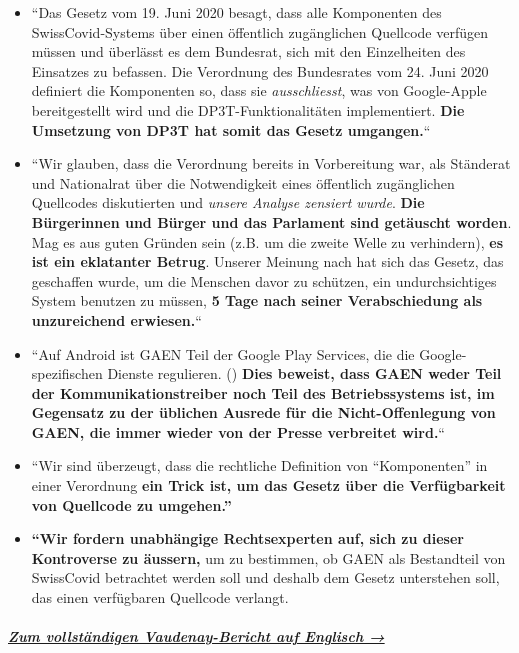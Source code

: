\begin{itemize}
\tightlist
\item
  ``Das Gesetz vom 19. Juni 2020 besagt, dass alle Komponenten des
  SwissCovid-Systems über einen öffentlich zugänglichen Quellcode
  verfügen müssen und überlässt es dem Bundesrat, sich mit den
  Einzelheiten des Einsatzes zu befassen. Die Verordnung des Bundesrates
  vom 24. Juni 2020 definiert die Komponenten so, dass sie
  \emph{ausschliesst}, was von Google-Apple bereitgestellt wird und die
  DP3T-Funktionalitäten implementiert. \textbf{Die Umsetzung von DP3T
  hat somit das Gesetz umgangen.}``
\item
  ``Wir glauben, dass die Verordnung bereits in Vorbereitung war, als
  Ständerat und Nationalrat über die Notwendigkeit eines öffentlich
  zugänglichen Quellcodes diskutierten und \emph{unsere Analyse zensiert
  wurde}. \textbf{Die Bürgerinnen und Bürger und das Parlament sind
  getäuscht worden}. Mag es aus guten Gründen sein (z.B. um die zweite
  Welle zu verhindern), \textbf{es ist ein eklatanter Betrug}. Unserer
  Meinung nach hat sich das Gesetz, das geschaffen wurde, um die
  Menschen davor zu schützen, ein undurchsichtiges System benutzen zu
  müssen, \textbf{5 Tage nach seiner Verabschiedung als unzureichend
  erwiesen.}``
\item
  ``Auf Android ist GAEN Teil der Google Play Services, die die
  Google-spezifischen Dienste regulieren. () \textbf{Dies beweist, dass
  GAEN weder Teil der Kommunikationstreiber noch Teil des
  Betriebssystems ist, im Gegensatz zu der üblichen Ausrede für die
  Nicht-Offenlegung von GAEN, die immer wieder von der Presse verbreitet
  wird.}``
\item
  ``Wir sind überzeugt, dass die rechtliche Definition von
  ``Komponenten'' in einer Verordnung \textbf{ein Trick ist, um das
  Gesetz über die Verfügbarkeit von Quellcode zu umgehen.''}
\item
  \textbf{``Wir fordern unabhängige Rechtsexperten auf, sich zu dieser
  Kontroverse zu äussern,} um zu bestimmen, ob GAEN als Bestandteil von
  SwissCovid betrachtet werden soll und deshalb dem Gesetz unterstehen
  soll, das einen verfügbaren Quellcode verlangt.
\end{itemize}

\hypertarget{zum-vollstuxe4ndigen-vaudenay-bericht-auf-englisch-}{%
\subparagraph{\texorpdfstring{\href{https://lasec.epfl.ch/people/vaudenay/swisscovid.html}{Zum
vollständigen Vaudenay-Bericht auf Englisch
→}}{Zum vollständigen Vaudenay-Bericht auf Englisch →}}\label{zum-vollstuxe4ndigen-vaudenay-bericht-auf-englisch-}}

